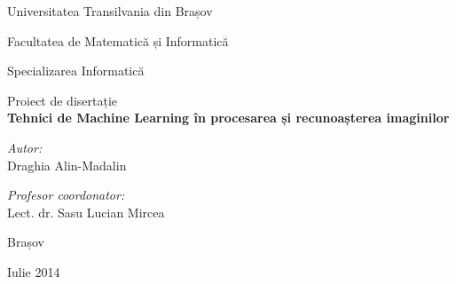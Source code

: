 \pagestyle{empty}

\begin{titlepage}

\begin{center}

\Large Universitatea Transilvania din Brașov

\Large Facultatea de Matematică și Informatică

\large Specializarea Informatică

\vfill
\Large Proiect de disertație\\[0.3cm]
 
{ \Huge \bfseries Tehnici de Machine Learning în procesarea și recunoașterea imaginilor}\\[2cm]
 
\begin{minipage}{0.4\textwidth}
\begin{flushleft} \large
\emph{Autor:}\\
Draghia Alin-Madalin
\end{flushleft}
\end{minipage}
\begin{minipage}{0.5\textwidth}
\begin{flushright} \large
\emph{Profesor coordonator:} \\
Lect. dr. Sasu Lucian Mircea
\end{flushright}
\end{minipage}
 
\vfill

{\Large Brașov}

{\large Iulie 2014}
 
\end{center}
 
\end{titlepage}
\pagestyle{fancy}